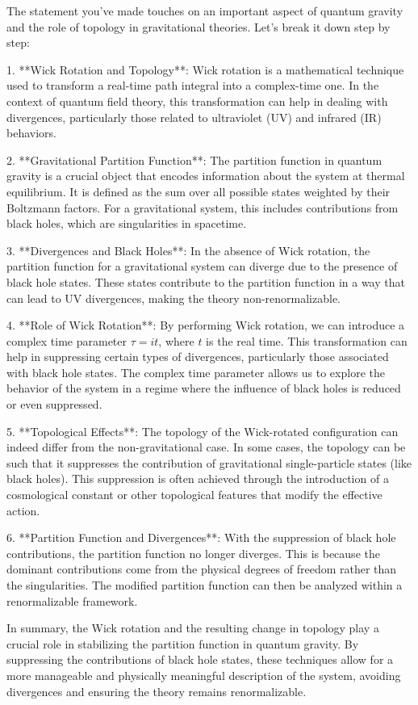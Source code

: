 The statement you've made touches on an important aspect of quantum gravity and the role of topology in gravitational theories. Let's break it down step by step:

1. **Wick Rotation and Topology**: Wick rotation is a mathematical technique used to transform a real-time path integral into a complex-time one. In the context of quantum field theory, this transformation can help in dealing with divergences, particularly those related to ultraviolet (UV) and infrared (IR) behaviors.

2. **Gravitational Partition Function**: The partition function in quantum gravity is a crucial object that encodes information about the system at thermal equilibrium. It is defined as the sum over all possible states weighted by their Boltzmann factors. For a gravitational system, this includes contributions from black holes, which are singularities in spacetime.

3. **Divergences and Black Holes**: In the absence of Wick rotation, the partition function for a gravitational system can diverge due to the presence of black hole states. These states contribute to the partition function in a way that can lead to UV divergences, making the theory non-renormalizable.

4. **Role of Wick Rotation**: By performing Wick rotation, we can introduce a complex time parameter \( \tau = it \), where \( t \) is the real time. This transformation can help in suppressing certain types of divergences, particularly those associated with black hole states. The complex time parameter allows us to explore the behavior of the system in a regime where the influence of black holes is reduced or even suppressed.

5. **Topological Effects**: The topology of the Wick-rotated configuration can indeed differ from the non-gravitational case. In some cases, the topology can be such that it suppresses the contribution of gravitational single-particle states (like black holes). This suppression is often achieved through the introduction of a cosmological constant or other topological features that modify the effective action.

6. **Partition Function and Divergences**: With the suppression of black hole contributions, the partition function no longer diverges. This is because the dominant contributions come from the physical degrees of freedom rather than the singularities. The modified partition function can then be analyzed within a renormalizable framework.

In summary, the Wick rotation and the resulting change in topology play a crucial role in stabilizing the partition function in quantum gravity. By suppressing the contributions of black hole states, these techniques allow for a more manageable and physically meaningful description of the system, avoiding divergences and ensuring the theory remains renormalizable.